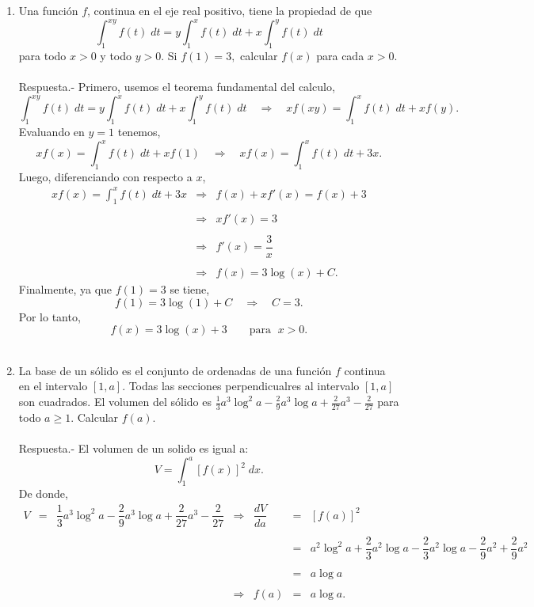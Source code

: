 \begin{enumerate}[\bfseries 1.]
    \item Una función $f$, continua en el eje real positivo, tiene la propiedad de que
    $$\int_1^{xy}f(t)\; dt = y\int_1^x f(t)\; dt + x\int_1^y f(t)\; dt$$
    para todo $x>0$ y todo $y>0$. Si $f(1)=3,$ calcular $f(x)$ para cada $x>0$.\\\\
	Respuesta.-\; Primero, usemos el teorema fundamental del calculo,
	$$\int_1^{xy}f(t)\; dt = y\int_1^x f(t)\; dt + x\int_1^y f(t)\; dt \quad \Rightarrow \quad xf(xy)=\int_1^x f(t)\; dt + xf(y).$$
	Evaluando en $y=1$ tenemos,
	$$xf(x)=\int_1^x f(t)\; dt + xf(1) \quad \Rightarrow \quad xf(x)=\int_1^x f(t)\; dt + 3x.$$
	Luego, diferenciando con respecto a $x$,
	$$
	\begin{array}{rcl}
	    xf(x)=\displaystyle\int_1^x f(t)\; dt + 3x &\Rightarrow& f(x)+xf'(x)=f(x) + 3\\\\
						      &\Rightarrow& xf'(x)=3\\\\
						      &\Rightarrow& f'(x)=\dfrac{3}{x}\\\\
						      &\Rightarrow& f(x)=3\log(x) + C.
	\end{array}
	$$
	Finalmente, ya que $f(1)=3$ se tiene,
	$$f(1)=3\log(1)+C\quad \Rightarrow \quad C=3.$$
	Por lo tanto, 
	$$f(x)=3\log(x)+3\qquad \mbox{para }\; x>0.$$\\

    \item La base de un sólido es el conjunto de ordenadas de una función $f$ continua en el intervalo $[1,a]$. Todas las secciones perpendicualres al intervalo $[1,a]$ son cuadrados. El volumen del sólido es $\frac{1}{3}a^3\log^2 a - \frac{2}{9}a^3\log a+\frac{2}{27}a^3-\frac{2}{27}$ para todo $a\geq 1$. Calcular $f(a)$.\\\\
	Respuesta.-\; El volumen de un solido es igual a:
	$$V=\int_1^a \left[f(x)\right]^2\; dx.$$
	De donde,
	$$
	\begin{array}{rcccccl}
	    V &=& \dfrac{1}{3}a^3\log^2 a - \dfrac{2}{9}a^3\log a+\dfrac{2}{27}a^3-\dfrac{2}{27} &\Rightarrow& \dfrac{dV}{da}&=&\left[f(a)\right]^2\\\\
	      &&&&&=&a^2\log^2 a + \dfrac{2}{3}a^2\log a - \dfrac{2}{3}a^2 \log a - \dfrac{2}{9}a^2+\dfrac{2}{9}a^2\\\\
	      &&&&&=&a\log a\\\\
	      &&&\Rightarrow&f(a)&=&a\log a.
	\end{array}
	$$

\end{enumerate}


